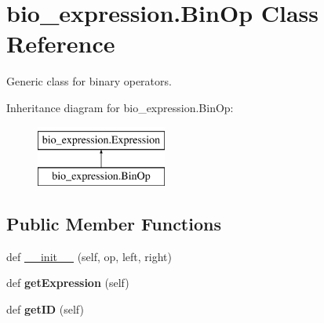 \hypertarget{classbio__expression_1_1_bin_op}{}\section{bio\+\_\+expression.\+Bin\+Op Class Reference}
\label{classbio__expression_1_1_bin_op}


Generic class for binary operators.  


Inheritance diagram for bio\+\_\+expression.\+Bin\+Op\+:\begin{figure}[H]
\begin{center}
\leavevmode
\includegraphics[height=2.000000cm]{classbio__expression_1_1_bin_op}
\end{center}
\end{figure}
\subsection*{Public Member Functions}
\begin{DoxyCompactItemize}
\item 
def \hyperlink{classbio__expression_1_1_bin_op_ad0da222e1ccbab37bc8c4aff6bb60449}{\+\_\+\+\_\+init\+\_\+\+\_\+} (self, op, left, right)
\item 
def {\bfseries get\+Expression} (self)\hypertarget{classbio__expression_1_1_bin_op_a6042d9d45382c5b7e3b7a4226b85e6c5}{}\label{classbio__expression_1_1_bin_op_a6042d9d45382c5b7e3b7a4226b85e6c5}

\item 
def {\bfseries get\+ID} (self)\hypertarget{classbio__expression_1_1_bin_op_aa38379572c964461a4dd70049ea993c9}{}\label{classbio__expression_1_1_bin_op_aa38379572c964461a4dd70049ea993c9}

\end{DoxyCompactItemize}
